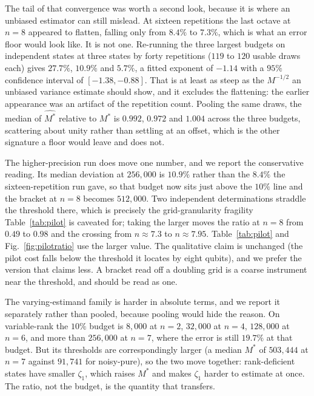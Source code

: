\documentclass[a4paper,superscriptaddress,nofootinbib,onecolumn,nopdfoutputerror]{quantumarticle}
\begin{document}
The tail of that convergence was worth a second look, because it is where an unbiased estimator
can still mislead. At sixteen repetitions the last octave at \(n = 8\) appeared to flatten,
falling only from \(8.4\%\) to \(7.3\%\), which is what an error floor would look like. It is not
one. Re-running the three largest budgets on independent states at three states by forty
repetitions (\(119\) to \(120\) usable draws each) gives \(27.7\%\), \(10.9\%\) and
\(5.7\%\), a fitted exponent of \(-1.14\)
with a \(95\%\) confidence interval of \([-1.38, -0.88]\). That is at least as steep as the
\(M^{-1/2}\) an unbiased variance estimate should show, and it excludes the flattening: the
earlier appearance was an artifact of the repetition count. Pooling the same draws, the
median of \(\widehat{M^*}\) relative to \(M^*\) is \(0.992\), \(0.972\) and \(1.004\) across the
three budgets, scattering about unity rather than settling at an offset, which is the other
signature a floor would leave and does not.

The higher-precision run does move one number, and we report the conservative reading. Its median
deviation at \(256{,}000\) is \(10.9\%\) rather than the \(8.4\%\) the sixteen-repetition run
gave, so that budget now sits just above the \(10\%\) line and the bracket at \(n = 8\) becomes
\(512{,}000\). Two independent determinations straddle the threshold there, which is precisely
the grid-granularity fragility Table~\ref{tab:pilot} is caveated for; taking the larger moves the
ratio at \(n = 8\) from \(0.49\) to \(0.98\) and the crossing from \(n \approx 7.3\) to
\(n \approx 7.95\). Table~\ref{tab:pilot} and Fig.~\ref{fig:pilotratio} use the larger value. The
qualitative claim is unchanged (the pilot cost falls below the threshold it locates by eight
qubits), and we prefer the version that claims less. A bracket read off a doubling grid is a
coarse instrument near the threshold, and should be read as one.

The varying-estimand family is harder in absolute terms, and we report it separately rather than
pooled, because pooling would hide the reason. On variable-rank the \(10\%\) budget is
\(8{,}000\) at \(n = 2\), \(32{,}000\) at \(n = 4\), \(128{,}000\) at \(n = 6\), and more than
\(256{,}000\) at \(n = 7\), where the error is still \(19.7\%\) at that budget. But its thresholds are correspondingly larger (a median \(M^*\) of \(503{,}444\) at
\(n = 7\) against \(91{,}741\) for noisy-pure), so the two move together: rank-deficient states have smaller \(\zeta_1\), which
raises \(M^*\) and makes \(\zeta_1\) harder to estimate at once. The ratio, not the budget, is the
quantity that transfers.
\end{document}

